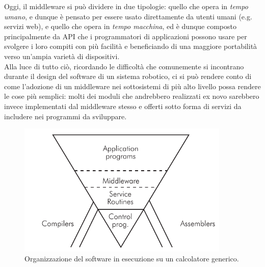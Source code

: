 Oggi, il middleware si può dividere in due tipologie: quello che opera in \emph{tempo umano}, e dunque è pensato per essere usato direttamente da utenti umani (e.g. servizi web), e quello che opera in \emph{tempo macchina}, ed è dunque composto principalmente da API che i programmatori di applicazioni possono usare per svolgere i loro compiti con più facilità e beneficiando di una maggiore portabilità verso un'ampia varietà di dispositivi.\\
Alla luce di tutto ciò, ricordando le difficoltà che comunemente si incontrano durante il design del software di un sistema robotico, ci si può rendere conto di come l'adozione di un middleware nei sottosistemi di più alto livello possa rendere le cose più semplici: molti dei moduli che andrebbero realizzati ex novo sarebbero invece implementati dal middleware stesso e offerti sotto forma di servizi da includere nei programmi da sviluppare.

\begin{figure}
    \centering
    \includegraphics[width=0.9\textwidth]{figs/chapter2/software_pyramid.png}
    \caption{Organizzazione del software in esecuzione su un calcolatore generico.}
    \label{fig:sw_pyramid}
\end{figure}

